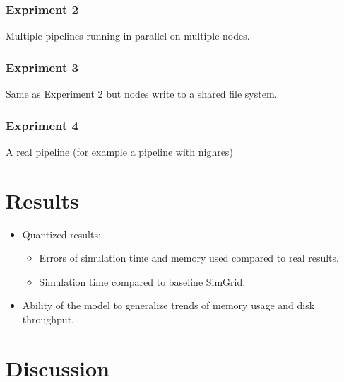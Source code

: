 \documentclass[11pt, a4paper]{article}
\begin{document}
			\subsubsection{Expriment 2}
				Multiple pipelines running in parallel on multiple nodes.
			\subsubsection{Expriment 3}
				Same as Experiment 2 but nodes write to a shared file system.
			\subsubsection{Expriment 4}
				A real pipeline (for example a pipeline with nighres)

	\section{Results}
	
		\begin{itemize}

			\item Quantized results: 
				\begin{itemize}
					\item Errors of simulation time and memory used compared to real results.
					\item Simulation time compared to baseline SimGrid.
				\end{itemize} 

			\item Ability of the model to generalize trends of memory usage and disk throughput.

		\end{itemize}

	\section{Discussion}
\end{document}
